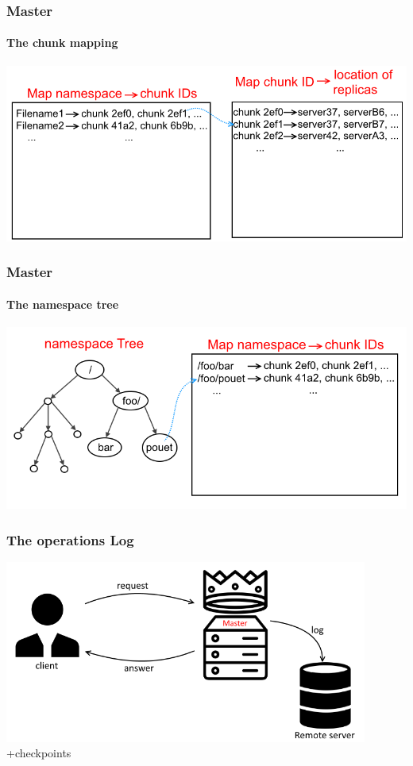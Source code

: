 \documentclass{beamer}
\begin{document}
\begin{frame}
 \frametitle{Master}
 \framesubtitle{The chunk mapping}
 \centering
 \includegraphics[height=\masterpicheight]{figures/namespaceMapMapschema.png}
\end{frame}

\begin{frame}
 \frametitle{Master}
 \framesubtitle{The namespace tree}
 \centering
 \includegraphics[height=\masterpicheight]{figures/namespaceTreeMapschema.png}
\end{frame}

\begin{frame}
 \frametitle{The operations Log}
 \begin{center}
 \includegraphics[height=6cm]{figures/logschema.png}
 \alert{+checkpoints}
 \end{center}
\end{frame}
\end{document}
